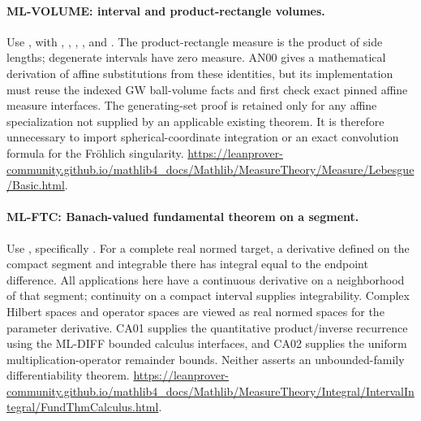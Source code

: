 \documentclass[11pt,a4paper]{article}
\theoremstyle{remark}\newtheorem{remark}[theorem]{Remark}
\begin{document}
\hypertarget{leaf:ML-VOLUME}{}\paragraph{ML-VOLUME: interval and product-rectangle volumes.}
Use , with
, ,
, , and
.
The product-rectangle measure is the product of side lengths; degenerate intervals have zero measure. AN00 gives a mathematical derivation of affine substitutions from these identities, but its implementation must reuse the indexed GW ball-volume facts and first check exact pinned affine measure interfaces. The generating-set proof is retained only for any affine specialization not supplied by an applicable existing theorem. It is therefore unnecessary to import spherical-coordinate integration or an exact convolution formula for the Fr\"ohlich singularity.
\url{https://leanprover-community.github.io/mathlib4_docs/Mathlib/MeasureTheory/Measure/Lebesgue/Basic.html}.

\hypertarget{leaf:ML-FTC}{}\paragraph{ML-FTC: Banach-valued fundamental theorem on a segment.}
Use , specifically
.
For a complete real normed target, a derivative defined on the compact segment and integrable there has integral equal to the endpoint difference. All applications here have a continuous derivative on a neighborhood of that segment; continuity on a compact interval supplies integrability. Complex Hilbert spaces and operator spaces are viewed as real normed spaces for the parameter derivative. CA01 supplies the quantitative product/inverse recurrence using the ML-DIFF bounded calculus interfaces, and CA02 supplies the uniform multiplication-operator remainder bounds. Neither asserts an unbounded-family differentiability theorem.
\url{https://leanprover-community.github.io/mathlib4_docs/Mathlib/MeasureTheory/Integral/IntervalIntegral/FundThmCalculus.html}.
\end{document}
